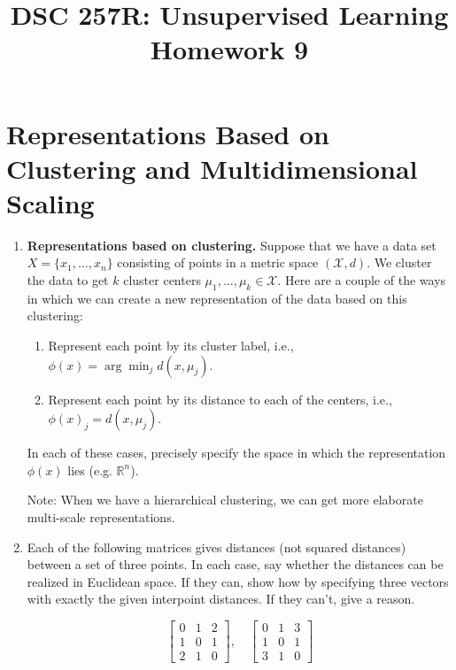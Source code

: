\documentclass{article}
\title{DSC 257R: Unsupervised Learning \\ Homework 9}
\author{}
\date{}
\begin{document}
\maketitle

\section*{Representations Based on Clustering and Multidimensional Scaling}

\begin{enumerate}
\item \textbf{Representations based on clustering.} Suppose that we have a data set $X=\{x_1, \ldots, x_n\}$ consisting of points in a metric space $(\mathcal{X}, d)$. We cluster the data to get $k$ cluster centers $\mu_1, \ldots, \mu_k \in \mathcal{X}$. Here are a couple of the ways in which we can create a new representation of the data based on this clustering:

\begin{enumerate}
\item Represent each point by its cluster label, i.e., $\phi(x) = \arg \min_j d(x, \mu_j)$.

\item Represent each point by its distance to each of the centers, i.e., $\phi(x)_j = d(x, \mu_j)$.
\end{enumerate}

In each of these cases, precisely specify the space in which the representation $\phi(x)$ lies (e.g. $\mathbb{R}^n$).

Note: When we have a hierarchical clustering, we can get more elaborate multi-scale representations.

\item Each of the following matrices gives distances (not squared distances) between a set of three points. In each case, say whether the distances can be realized in Euclidean space. If they can, show how by specifying three vectors with exactly the given interpoint distances. If they can't, give a reason.

\[
\begin{bmatrix}
0 & 1 & 2 \\
1 & 0 & 1 \\
2 & 1 & 0
\end{bmatrix}, \quad
\begin{bmatrix}
0 & 1 & 3 \\
1 & 0 & 1 \\
3 & 1 & 0
\end{bmatrix}
\]


\end{enumerate}
\end{document}
